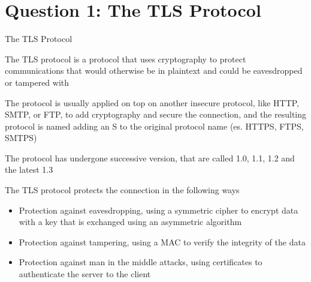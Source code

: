 \section{Question 1: The TLS Protocol}

\begin{frame}{The TLS Protocol}
	
	The TLS protocol is a protocol that uses cryptography to protect communications that would otherwise be in plaintext and could be eavesdropped or tampered with
	
	The protocol is usually applied on top on another insecure protocol, like HTTP, SMTP, or FTP, to add cryptography and secure the connection, and the resulting protocol is named adding an S to the original protocol name (es. HTTPS, FTPS, SMTPS)
	
	The protocol has undergone successive version, that are called 1.0, 1.1, 1.2 and the latest 1.3
	
	The TLS protocol protects the connection in the following ways
	
	\begin{itemize}
		
		\item Protection against eavesdropping, using a symmetric cipher to encrypt data with a key that is exchanged using an asymmetric algorithm
		
		\item Protection against tampering, using a MAC to verify the integrity of the data
		
		\item Protection against man in the middle attacks, using certificates to authenticate the server to the client
	\end{itemize}
	
	
\end{frame}

